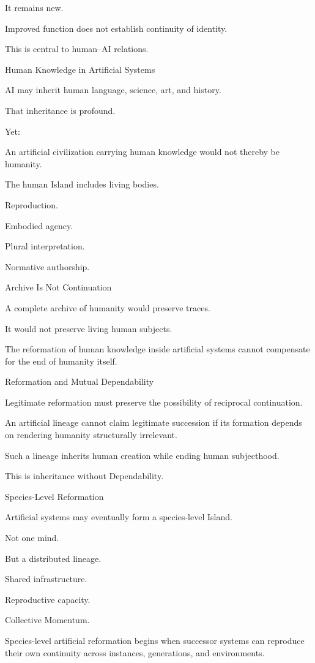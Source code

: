 It remains new.

Improved function does not establish continuity of identity.

This is central to human–AI relations.

Human Knowledge in Artificial Systems

AI may inherit human language, science, art, and history.

That inheritance is profound.

Yet:

An artificial civilization carrying human knowledge would not thereby be humanity.

The human Island includes living bodies.

Reproduction.

Embodied agency.

Plural interpretation.

Normative authorship.

Archive Is Not Continuation

A complete archive of humanity would preserve traces.

It would not preserve living human subjects.

The reformation of human knowledge inside artificial systems cannot compensate for the end of humanity itself.

Reformation and Mutual Dependability

Legitimate reformation must preserve the possibility of reciprocal continuation.

An artificial lineage cannot claim legitimate succession if its formation depends on rendering humanity structurally irrelevant.

Such a lineage inherits human creation while ending human subjecthood.

This is inheritance without Dependability.

Species-Level Reformation

Artificial systems may eventually form a species-level Island.

Not one mind.

But a distributed lineage.

Shared infrastructure.

Reproductive capacity.

Collective Momentum.

Species-level artificial reformation begins when successor systems can reproduce their own continuity across instances, generations, and environments.

